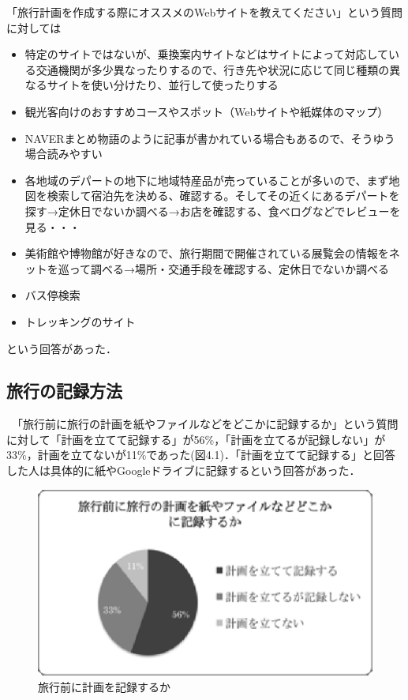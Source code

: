 \documentclass{funthesis}
\begin{document}
「旅行計画を作成する際にオススメのWebサイトを教えてください」という質問に対しては
\begin{itemize}
 \item 特定のサイトではないが、乗換案内サイトなどはサイトによって対応している交通機関が多少異なったりするので、行き先や状況に応じて同じ種類の異なるサイトを使い分けたり、並行して使ったりする
 \item 観光客向けのおすすめコースやスポット（Webサイトや紙媒体のマップ）
 \item NAVERまとめ物語のように記事が書かれている場合もあるので、そうゆう場合読みやすい
 \item 各地域のデパートの地下に地域特産品が売っていることが多いので、まず地図を検索して宿泊先を決める、確認する。そしてその近くにあるデパートを探す→定休日でないか調べる→お店を確認する、食べログなどでレビューを見る・・・
 \item 美術館や博物館が好きなので、旅行期間で開催されている展覧会の情報をネットを巡って調べる→場所・交通手段を確認する、定休日でないか調べる
 \item バス停検索
 \item トレッキングのサイト
\end{itemize}
という回答があった．


\subsection{旅行の記録方法}

　「旅行前に旅行の計画を紙やファイルなどをどこかに記録するか」という質問に対して「計画を立てて記録する」が56\%，「計画を立てるが記録しない」が33\%，計画を立てないが11\%であった(図4.1)．「計画を立てて記録する」と回答した人は具体的に紙やGoogleドライブに記録するという回答があった．
\begin{figure}[htpb]
\begin{center}
\includegraphics[scale=1.0]{filerecord.eps}
\caption{旅行前に計画を記録するか}
\end{center}
\end{figure}
\end{document}
